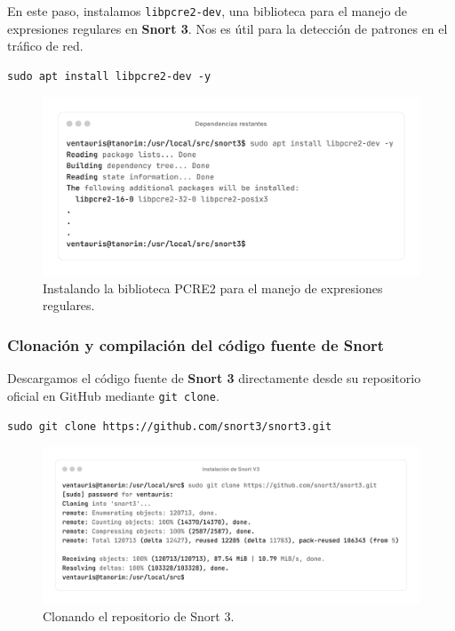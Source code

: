 \documentclass[11pt,a4paper,twoside]{report}
\begin{document}
En este paso, instalamos \texttt{libpcre2-dev}, una biblioteca para el manejo de expresiones regulares en \textbf{Snort 3}. Nos es útil para la detección de patrones en el tráfico de red.

\begin{lstlisting}[style=commandstyle, caption={Instalando la biblioteca PCRE2 para expresiones regulares}]
	sudo apt install libpcre2-dev -y
\end{lstlisting}

\begin{figure}[H]
	\centering
	\includegraphics[scale=0.12]{instalacion_snort/20-20.png}
	\caption{Instalando la biblioteca PCRE2 para el manejo de expresiones regulares.}
\end{figure}

\newpage

\subsubsection*{Clonación y compilación del código fuente de Snort}

Descargamos el código fuente de \textbf{Snort 3} directamente desde su repositorio oficial en GitHub mediante \texttt{git clone}.

\begin{lstlisting}[style=commandstyle, caption={Clonando el repositorio de Snort 3}]
	sudo git clone https://github.com/snort3/snort3.git
\end{lstlisting}

\begin{figure}[H]
	\centering
	\includegraphics[scale=0.12]{instalacion_snort/17-17.png}
	\caption{Clonando el repositorio de Snort 3.}
\end{figure}
\end{document}
